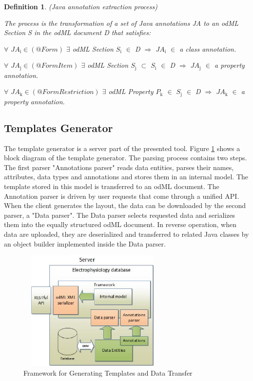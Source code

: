 \documentclass[a4paper,twoside]{article}
\newtheorem{definition}{Definition}
\begin{document}
\begin{definition}
\label{def:Java_annotation_extraction_process}
(Java annotation extraction process)

\emph{The process is the transformation of a set of Java annotations JA to an odML Section S in the odML document D that satisfies:}

\emph{$\forall$ $JA{}_{\text{i}}\in {(@Form)}$ $\exists$ odML Section $S{}_{\text{i}}$ $\in$ D $\Rightarrow$ $JA{}_{\text{i}}$ $\in$ a class annotation}.

\emph{$\forall$ $JA{}_{\text{j}}\in {(@FormItem)}$ $\exists$ odML Section $S{}_{\text{j}}$ $\subset$ $S{}_{\text{i}}$ $\in$ D $\Rightarrow$ $JA{}_{\text{j}}$ $\in$ a property
annotation}.

\emph{$\forall$ $JA{}_{\text{k}}\in {(@FormRestriction)}$ $\exists$ odML Property $P{}_{\text{k}}$ $\in$ $S{}_{\text{j}}$ $\in$ D $\Rightarrow$ $JA{}_{\text{k}}$ $\in$ a property  annotation}.

\end{definition}

\subsection{Templates Generator}

The template generator is a server part of the presented tool. Figure \ref{framework} shows a block diagram of the template generator. The parsing process contains two steps. The first parser "Annotations parser" reads data entities, parses their names, attributes, data types and annotations and stores them in an internal model. The template stored in this model is transferred to an odML document. The Annotation parser is driven by user requests that come through a unified API. When the client generates the layout, the data can be downloaded by the second parser, a "Data parser". The Data parser selects requested data and serializes them into the equally structured odML document. In reverse operation,  when data are uploaded, they are deserialized and transferred to related Java classes by an object builder implemented inside the Data parser.

\begin{figure}
\centering\includegraphics[width=7.5cm, height=6cm]{Framework}
\caption{\label{framework}Framework for Generating Templates and Data Transfer}
\end{figure}
\end{document}
